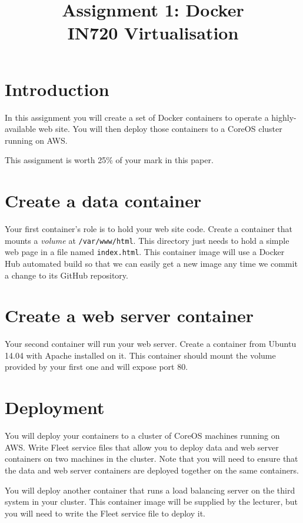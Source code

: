 \documentclass{article}
\begin{document}
\title{Assignment 1: Docker \\ IN720 Virtualisation}
\date{}
\maketitle

\section*{Introduction}
In this assignment you will create a set of Docker containers to operate a highly-available web site.  You will then deploy those containers to a CoreOS cluster running on AWS.

This assignment is worth 25\% of your mark in this paper.

\section{Create a data container}
Your first container's role is to hold your web site code.  Create a container that mounts a \emph{volume} at \texttt{/var/www/html}. This directory just needs to hold a simple web page in a file named \texttt{index.html}. This container image will use a Docker Hub automated build so that we can easily get a new image any time we commit a change to its GitHub repository.

\section{Create a web server container}
Your second container will run your web server. Create a container from Ubuntu 14.04 with Apache installed on it. This container should mount the volume provided by your first one and will expose port 80.

\section{Deployment}
You will deploy your containers to a cluster of CoreOS machines running on AWS. Write Fleet service files that allow you to deploy data and web server containers on two machines in the cluster.  Note that you will need to ensure that the data and web server containers are deployed together on the same containers.

You will deploy another container that runs a load balancing server on the third system in your cluster. This container image will be supplied by the lecturer, but you will need to write the Fleet service file to deploy it.
\end{document}
